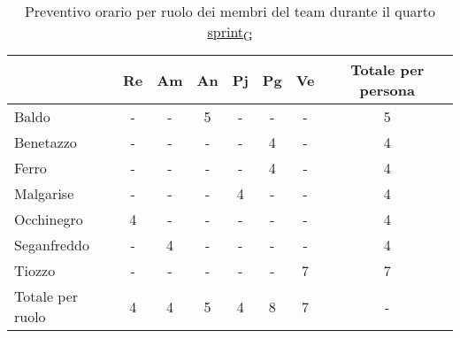 \begin{table}[!h]
	\centering
	\begin{tabular}{ | l | c | c | c | c | c | c | c | }
		\hline
		\textbf{}        & \textbf{Re} & \textbf{Am} & \textbf{An} & \textbf{Pj} & \textbf{Pg} & \textbf{Ve} & \textbf{Totale per persona} \\
		\hline
		Baldo            & -           & -           & 5           & -           & -           & -           & 5                           \\
		Benetazzo        & -           & -           & -           & -           & 4           & -           & 4                           \\
		Ferro            & -           & -           & -           & -           & 4           & -           & 4                           \\
		Malgarise        & -           & -           & -           & 4           & -           & -           & 4                           \\
		Occhinegro       & 4           & -           & -           & -           & -           & -           & 4                           \\
		Seganfreddo      & -           & 4           & -           & -           & -           & -           & 4                           \\
		Tiozzo           & -           & -           & -           & -           & -           & 7           & 7                           \\
		\hline
		Totale per ruolo & 4           & 4           & 5           & 4           & 8           & 7           & -                           \\
		\hline
	\end{tabular}
	\caption{Preventivo orario per ruolo dei membri del team durante il quarto \href{https://7last.github.io/docs/pb/documentazione-interna/glossario\#sprint}{sprint\textsubscript{G}}}
	
\end{table}

